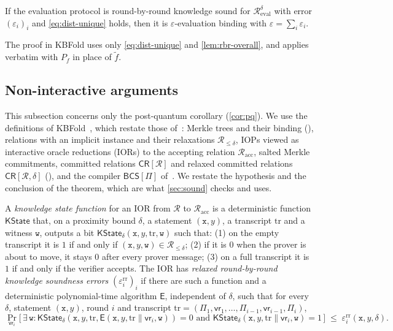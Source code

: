 \begin{lemma}\label{lem:rbr-binding}
If the evaluation protocol is round-by-round knowledge sound for $\mathcal{R}^\delta_{\mathrm{eval}}$ with error $(\varepsilon_i)_i$ and \eqref{eq:dist-unique} holds, then it is $\varepsilon$-evaluation binding with $\varepsilon = \sum_i \varepsilon_i$.
\end{lemma}

The proof in KBFold uses only \eqref{eq:dist-unique} and \cref{lem:rbr-overall}, and applies verbatim with $P_f$ in place of $\tilde f$.

\subsection{Non-interactive arguments}\label{sec:proofs:bcs}

This subsection concerns only the post-quantum corollary (\cref{cor:pq}).
We use the definitions of KBFold~\cite[\S3.5]{Mkh26}, which restate those of~\cite{CDHZ25}: Merkle trees and their binding (), relations with an implicit instance and their relaxations $\mathcal{R}_{\le\delta}$, IOPs viewed as interactive oracle reductions (IORs) to the accepting relation $\mathcal{R}_{\mathrm{acc}}$, salted Merkle commitments, committed relations $\mathsf{CR}[\mathcal{R}]$ and relaxed committed relations $\widehat{\mathsf{CR}}[\mathcal{R},\delta]$ (), and the compiler $\mathsf{BCS}[\Pi]$ of~\cite[Construction~11.7]{CDHZ25}.
We restate the hypothesis and the conclusion of the theorem, which are what \cref{sec:sound} checks and uses.

\begin{definition}\label{def:rrbr}
A \emph{knowledge state function} for an IOR from $\mathcal{R}$ to $\mathcal{R}_{\mathrm{acc}}$ is a deterministic function $\mathsf{KState}$ that, on a proximity bound $\delta$, a statement $(\mathtt{x}, y)$, a transcript $\mathrm{tr}$ and a witness $\mathtt{w}$, outputs a bit $\mathsf{KState}_\delta(\mathtt{x},y,\mathrm{tr},\mathtt{w})$ such that:
(1) on the empty transcript it is $1$ if and only if $(\mathtt{x},y,\mathtt{w}) \in \mathcal{R}_{\le\delta}$;
(2) if it is $0$ when the prover is about to move, it stays $0$ after every prover message;
(3) on a full transcript it is $1$ if and only if the verifier accepts.
The IOR has \emph{relaxed round-by-round knowledge soundness errors} $(\varepsilon^{\mathrm{rr}}_i)_i$ if there are such a function and a deterministic polynomial-time algorithm $\mathsf{E}$, independent of $\delta$, such that for every $\delta$, statement $(\mathtt{x},y)$, round $i$ and transcript $\mathrm{tr} = (\Pi_1,\mathsf{vr}_1,\dots,\Pi_{i-1},\mathsf{vr}_{i-1},\Pi_i)$,
\[
  \Pr_{\mathsf{vr}_i}\bigl[\, \exists\,\mathtt{w} : \mathsf{KState}_\delta(\mathtt{x},y,\mathrm{tr},\mathsf{E}(\mathtt{x},y,\mathrm{tr}\|\mathsf{vr}_i,\mathtt{w})) = 0 \text{ and } \mathsf{KState}_\delta(\mathtt{x},y,\mathrm{tr}\|\mathsf{vr}_i,\mathtt{w}) = 1 \,\bigr] \;\le\; \varepsilon^{\mathrm{rr}}_i(\mathtt{x},y,\delta).
\]
\end{definition}


